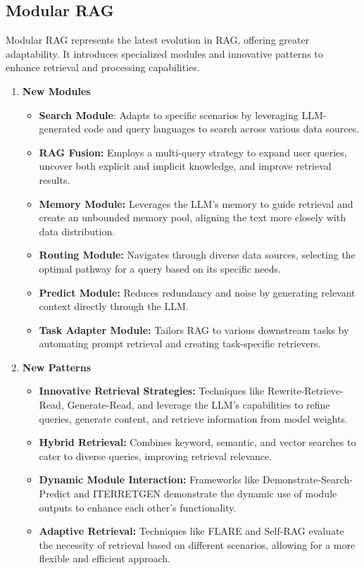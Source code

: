 \subsection{Modular RAG} 
Modular RAG represents the latest evolution in RAG, offering greater adaptability. It introduces specialized modules and innovative patterns to enhance retrieval and processing capabilities.
\begin{enumerate}
	
\item \textbf{New Modules}
\begin{itemize}
	\item \textbf{Search Module}: Adapts to specific scenarios by leveraging LLM-generated code and query languages to search across various data sources.
	\item \textbf{RAG Fusion:} Employs a multi-query strategy to expand user queries, uncover both explicit and implicit knowledge, and improve retrieval results.
	\item\textbf{ Memory Module:} Leverages the LLM's memory to guide retrieval and create an unbounded memory pool, aligning the text more closely with data distribution.
	\item \textbf{Routing Module:} Navigates through diverse data sources, selecting the optimal pathway for a query based on its specific needs.
	\item \textbf{Predict Module: } Reduces redundancy and noise by generating relevant context directly through the LLM.
	\item \textbf{Task Adapter Module:} Tailors RAG to various downstream tasks by automating prompt retrieval and creating task-specific retrievers.
\end{itemize}
\item \textbf{New Patterns} 
\begin{itemize}
	\item \textbf{Innovative Retrieval Strategies:} Techniques like Rewrite-Retrieve-Read, Generate-Read, and leverage the LLM's capabilities to refine queries, generate content, and retrieve information from model weights.
	\item \textbf{Hybrid Retrieval:} Combines keyword, semantic, and vector searches to cater to diverse queries, improving retrieval relevance.
	\item \textbf{Dynamic Module Interaction:} Frameworks like Demonstrate-Search-Predict and ITERRETGEN demonstrate the dynamic use of module outputs to enhance each other's functionality.
	\item\textbf{ Adaptive Retrieval:} Techniques like FLARE and Self-RAG evaluate the necessity of retrieval based on different scenarios, allowing for a more flexible and efficient approach.
	
\end{itemize}
\end{enumerate}
